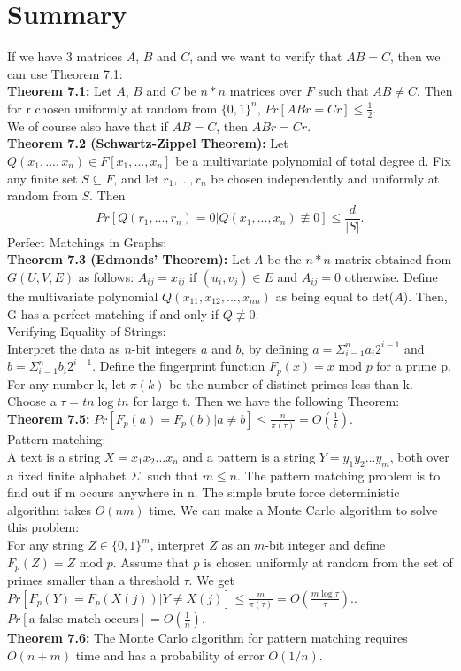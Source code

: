 \documentclass[12pt]{article}
\begin{document}
\section*{Summary}
If we have 3 matrices $A$, $B$ and $C$, and we want to verify that $AB=C$, then we can use Theorem 7.1:\\
\textbf{Theorem 7.1: } Let $A$, $B$ and $C$ be $n*n$ matrices over $F$ such that $AB\neq C$. Then for r chosen uniformly at random from $\{0,1\}^n$, $Pr[ABr=Cr]\leq\frac{1}{2}$.\\
We of course also have that if $AB=C$, then $ABr=Cr$.\\
\textbf{Theorem 7.2 (Schwartz-Zippel Theorem): } Let $Q(x_1,...,x_n)\in F[x_1,...,x_n]$ be a multivariate polynomial of total degree d. Fix any finite set $S\subseteq F$, and let $r_1,...,r_n$ be chosen independently and uniformly at random from $S$. Then $$Pr[Q(r_1,...,r_n)=0|Q(x_1,...,x_n)\not\equiv0]\leq\frac{d}{|S|}.$$
Perfect Matchings in Graphs:\\
\textbf{Theorem 7.3 (Edmonds' Theorem): } Let $A$ be the $n*n$ matrix obtained from $G(U,V,E)$ as follows: $A_{ij}=x_{ij}$ if $(u_i,v_j)\in E$ and $A_{ij}=0$ otherwise. Define the multivariate polynomial $Q(x_{11},x_{12},...,x_{nn})$ as being equal to det($A$). Then, G has a perfect matching if and only if $Q\not\equiv0$.\\
Verifying Equality of Strings:\\
Interpret the data as $n$-bit integers $a$ and $b$, by defining $a=\Sigma_{i=1}^na_i2^{i-1}$ and $b=\Sigma_{i=1}^nb_i2^{i-1}$. Define the fingerprint function $F_p(x)=x\text{ mod }p$ for a prime p. For any number k, let $\pi(k)$ be the number of distinct primes less than k. Choose a $\tau=tn\log tn$ for large t. Then we have the following Theorem:\\
\textbf{Theorem 7.5: } $Pr[F_p(a)=F_p(b)|a\neq b]\leq\frac{n}{\pi(\tau)}=O(\frac{1}{t})$.\\
Pattern matching:\\
A text is a string $X=x_1x_2...x_n$ and a pattern is a string $Y=y_1y_2...y_m$, both over a fixed finite alphabet $\Sigma$, such that $m\leq n$. The pattern matching problem is to find out if m occurs anywhere in n. The simple brute force deterministic algorithm takes $O(nm)$ time. We can make a Monte Carlo algorithm to solve this problem:\\
For any string $Z\in\{0,1\}^m$, interpret $Z$ as an $m$-bit integer and define $F_p(Z)=Z\text{ mod }p$. Assume that $p$ is chosen uniformly at random from the set of primes smaller than a threshold $\tau$. We get $Pr[F_p(Y)=F_p(X(j))|Y\neq X(j)]\leq\frac{m}{\pi(\tau)}=O\left(\frac{m\log\tau}{\tau}\right).$. $Pr[\text{a false match occurs}]=O(\frac{1}{n})$.\\
\textbf{Theorem 7.6: } The Monte Carlo algorithm for pattern matching requires $O(n+m)$ time and has a probability of error $O(1/n)$.
\end{document}

